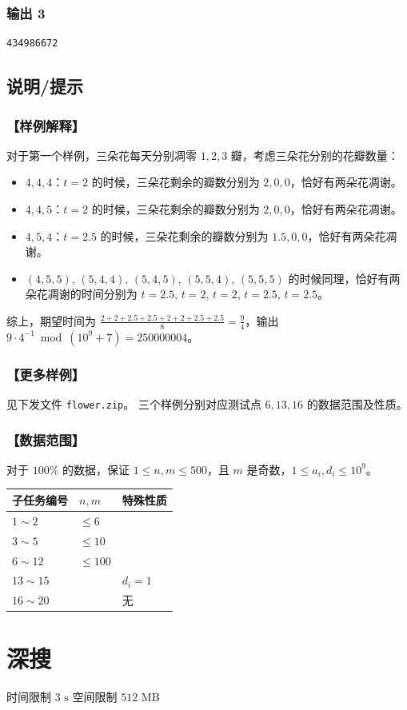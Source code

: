 \documentclass[12pt,a4paper,oneside]{ctexart}
\begin{document}
\subsubsection*{输出 3}
\begin{verbatim}
434986672
\end{verbatim}
\subsection*{说明/提示}
\subsubsection*{【样例解释】}
对于第一个样例，三朵花每天分别凋零 $1, 2, 3$ 瓣，考虑三朵花分别的花瓣数量：
\begin{itemize}
\item $4, 4, 4$：$t=2$ 的时候，三朵花剩余的瓣数分别为 $2, 0, 0$，恰好有两朵花凋谢。
\item $4, 4, 5$：$t=2$ 的时候，三朵花剩余的瓣数分别为 $2, 0, 0$，恰好有两朵花凋谢。
\item $4, 5, 4$：$t=2.5$ 的时候，三朵花剩余的瓣数分别为 $1.5, 0, 0$，恰好有两朵花凋谢。
\item $(4, 5, 5)$, $(5, 4, 4)$, $(5, 4, 5)$, $(5, 5, 4)$, $(5, 5, 5)$ 的时候同理，恰好有两朵花凋谢的时间分别为 $t=2.5$, $t=2$, $t=2$, $t=2.5$, $t=2.5$。
\end{itemize}
综上，期望时间为 $\frac{2 + 2 + 2.5 + 2.5 + 2 + 2 + 2.5 + 2.5}{8} = \frac{9}{4}$，输出 $9 \cdot 4^{-1} \bmod (10^9+7) = 250000004$。
\subsubsection*{【更多样例】}
见下发文件 \texttt{flower.zip}。
三个样例分别对应测试点 $6,13,16$ 的数据范围及性质。
\subsubsection*{【数据范围】}
对于 $100\%$ 的数据，保证 $1\le n,m\le 500$，且 $m$ 是奇数，$1\le a_i,d_i\le 10^9$。
\begin{center}\small
\begin{tabularx}{\textwidth}{|>{\centering\arraybackslash}X|>{\centering\arraybackslash}X|>{\centering\arraybackslash}X|}\hline
子任务编号 & $n,m$ & 特殊性质\\\hline
$1\sim 2$ & $\le 6$ & \multirow{3}{*}{无}\\\cline{1-2}
$3\sim 5$ & $\le 10$ & \\\cline{1-2}
$6\sim 12$ & $\le 100$ & \\\hline
$13\sim 15$ & \multirow{2}{*}{$\le 500$} & $d_i=1$\\\cline{1-1}\cline{3-3}
$16\sim 20$ &  & 无\\\hline
\end{tabularx}
\end{center}
\newpage\section{深搜}
时间限制 $\text{3 s}$
空间限制 $\text{512 MB}$
\end{document}
